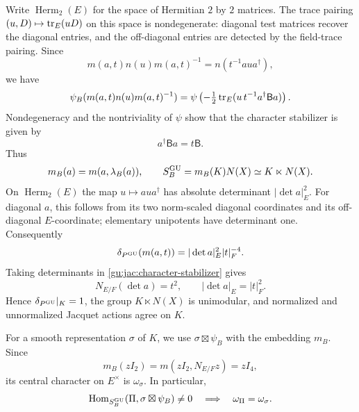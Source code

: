 Write $\operatorname{Herm}_2(E)$ for the space of Hermitian $2$ by $2$ matrices. The trace pairing $(u,D)\mapsto\operatorname{tr}_E(uD)$ on this space
is nondegenerate: diagonal test matrices recover the diagonal entries,
and the off-diagonal entries are detected by the field-trace pairing.
Since
\begin{equation}\label{gu:jac:levi-conjugation}
 m(a,t)n(u)m(a,t)^{-1}=n(t^{-1}aua^\dagger),
\end{equation}
we have
\[
 \psi_B(m(a,t)n(u)m(a,t)^{-1})
 =\psi\left(-\tfrac12\operatorname{tr}_E(u\,t^{-1}a^\dagger\mathsf Ba)\right).
\]
Nondegeneracy and the nontriviality of $\psi$ show that the character
stabilizer is given by
\begin{equation}\label{gu:jac:character-stabilizer}
 a^\dagger\mathsf Ba=t\mathsf B.
\end{equation}
Thus
\begin{equation}\label{gu:eq:shalika-embedding}
 m_B(a)=m(a,\lambda_B(a)),\qquad
 S_B^{\operatorname{GU}}=m_B(K)N(X)\simeq K\ltimes N(X).
\end{equation}
On $\operatorname{Herm}_2(E)$ the map $u\mapsto aua^\dagger$ has absolute
determinant $|\det a|_E^2$. For diagonal $a$, this follows from its two
norm-scaled diagonal coordinates and its off-diagonal $E$-coordinate;
elementary unipotents have determinant one. Consequently
\begin{equation}\label{gu:jac:siegel-modulus}
 \delta_{P^{\operatorname{GU}}}(m(a,t))=|\det a|_E^2|t|_F^{-4}.
\end{equation}
Taking determinants in \eqref{gu:jac:character-stabilizer} gives
\begin{equation}\label{gu:jac:plane-determinant}
 N_{E/F}(\det a)=t^2,\qquad |\det a|_E=|t|_F^2.
\end{equation}
Hence $\delta_{P^{\operatorname{GU}}}|_K=1$, the group $K\ltimes N(X)$ is unimodular,
and normalized and unnormalized Jacquet actions agree on $K$.

For a smooth representation $\sigma$ of $K$, we use $\sigma\boxtimes\psi_B$ with the embedding $m_B$. Since
\[
 m_B(zI_2)=m(zI_2,N_{E/F}z)=zI_4,
\]
its central character on $E^\times$ is $\omega_\sigma$. In particular,
\begin{equation}\label{gu:eq:central-necessary}
 \operatorname{Hom}_{S_B^{\operatorname{GU}}}(\Pi,\sigma\boxtimes\psi_B)\ne0
 \quad\Longrightarrow\quad\omega_\Pi=\omega_\sigma.
\end{equation}

